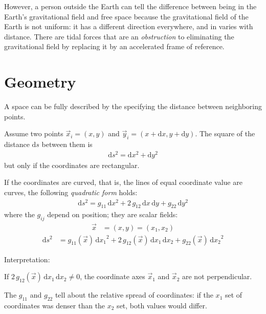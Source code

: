 \documentclass[pagesize,headsepline,10pt,parskip=half,BCOR=12mm]{scrreprt}
\begin{document}
      However, a person outside the Earth can tell the difference
      between being in the Earth's gravitational field and free
      space because the gravitational field of the Earth is not
      uniform: it has a different direction everywhere, and in
      varies with distance.  There are tidal forces that are an
      \emph{obstruction} to eliminating the gravitational field by
      replacing it by an accelerated frame of reference.

    \section{Geometry}
      A space can be fully described by the specifying the distance
      between neighboring points.

      Assume two points $\vec x_i = (x, y)$ and $\vec y_i = (x +
      \mathrm{d}x, y + \mathrm{d}y)$.  The square of the distance $\mathrm{d}s$
      between them is
      \begin{align}\label{eq:flat}
        \mathrm{d}s^2 = \mathrm{d}x^2 + \mathrm{d}y^2
      \end{align}
      but only if the coordinates are rectangular.

      If the coordinates are curved, that is, the lines of equal
      coordinate value are curves, the following \emph{quadratic
      form} holds:
      \begin{align*}
        \mathrm{d}s^2 = g_{11}\,\mathrm{d}x^2 + 2\,g_{12}\,
        \mathrm{d}x\,\mathrm{d}y + g_{22}\,\mathrm{d}y^2
      \end{align*}
      where the $g_{ij}$ depend on position; they are scalar
      fields:
      \begin{align*}
        \vec x &= (x, y) = (x_1, x_2)
      \end{align*}
      \begin{align}
        \mathrm{d}s^2 &= g_{11}(\vec x)\,{\mathrm{d}x_1}^2 + 2\,
        g_{12}(\vec x)\,\mathrm{d}x_1\,\mathrm{d}x_2 + g_{22}(\vec
        x)\,{\mathrm{d}x_2}^2
      \end{align}

      Interpretation:

      If $2\,g_{12}(\vec x)\,\mathrm{d}x_1\,
      \mathrm{d}x_2 \neq 0$, the coordinate axes
      $\vec x_1$ and $\vec x_2$ are not perpendicular.

      The $g_{11}$ and $g_{22}$ tell about the relative spread of
      coordinates: if the $x_1$ set of coordinates was denser
      than the $x_2$ set, both values would differ.
\end{document}
